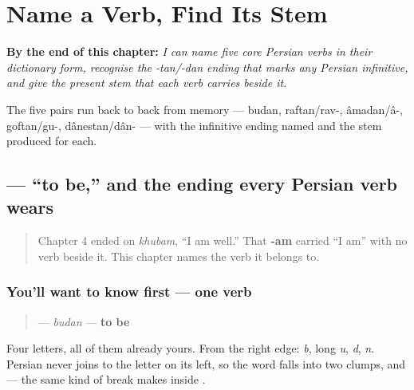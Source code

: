 
\chapter{Name a Verb, Find Its Stem}
\label{ch:fa-core-verbs}

\begin{chapteropening}
\textbf{By the end of this chapter:} \emph{I can name five core Persian verbs in their dictionary form, recognise the -tan/-dan ending that marks any Persian infinitive, and give the present stem that each verb carries beside it.}

The five pairs run back to back from memory — budan, raftan/rav-, âmadan/â-, goftan/gu-, dânestan/dân- — with the infinitive ending named and the stem produced for each.
\end{chapteropening}

\section[\texorpdfstring{\fa{بودن} (budan)}{بودن (budan)}]{ — “to be,” and the ending every Persian verb wears}

\label{lesson:FA-C06-budan}



\begin{quote}
Chapter 4 ended on \emph{khubam}, “I am well.” That \textbf{-am} carried “I am” with no verb beside it. This chapter names the verb it belongs to.
\end{quote}

\subsection*{You'll want to know first — one verb}
\begin{quote}
\textbf{} — \emph{budan} — \textbf{to be}
\end{quote}

Four letters, all of them already yours. From the right edge: \textbf{} \emph{b}, \textbf{} long \emph{u}, \textbf{} \emph{d}, \textbf{} \emph{n}. Persian \textbf{} never joins to the letter on its left, so the word falls into two clumps, \textbf{} and \textbf{} — the same kind of break \textbf{} makes inside \textbf{}.


